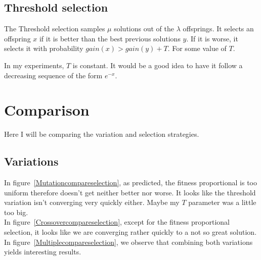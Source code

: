 \documentclass{article}
\theoremstyle{plain} %
\theoremstyle{definition} %
\begin{document}
\subsection{Threshold selection}

The Threshold selection samples $\mu$ solutions out of the $\lambda$
offsprings. It selects an offspring $x$ if it is better than the best previous
solutions $y$. If it is worse, it selects it with probability $gain(x) >
gain(y) + T$. For some value of $T$.

In my experiments, $T$ is constant. It would be a good idea to have it follow a decreasing sequence of the form $e^{-x}$.

\section{Comparison}

Here I will be comparing the variation and selection strategies.

\subsection{Variations}

In figure~\ref{Mutationcompareselection}, as predicted, the fitness
proportional is too uniform therefore doesn't get neither better nor worse.  It
looks like the threshold variation isn't converging very quickly either.  Maybe
my $T$ parameter was a little too big.
\\
In figure~\ref{Crossovercompareselection}, except for the fitness proportional
selection, it looks like we are converging rather quickly to a not so great
solution.
\\
In figure~\ref{Multiplecompareselection}, we observe that combining both
variations yields interesting results.
\end{document}
